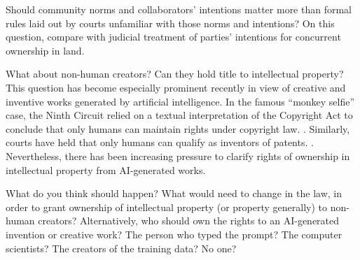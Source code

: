 Should community norms and collaborators' intentions matter more than formal
rules laid out by courts unfamiliar with those norms and intentions? On this
question, compare with judicial treatment of parties' intentions for concurrent
ownership in land.







\item What about non-human creators? Can they hold title to intellectual
property? This question has become especially prominent recently in view of
creative and inventive works generated by artificial intelligence. In the famous
``monkey selfie'' case, the Ninth Circuit relied on a textual interpretation of
the Copyright Act to conclude that only humans can maintain rights under
copyright law. . Similarly, courts have
held that only humans can qualify as inventors of patents. .
Nevertheless, there has
been increasing pressure to clarify rights of ownership in intellectual
property from AI-generated works. 

What do you think should happen? What would need to change in the law, in order
to grant ownership of intellectual property (or property generally) to non-human
creators? Alternatively, who should own the rights to an AI-generated invention
or creative work? The person who typed the prompt? The computer scientists? The
creators of the training data? No one?


